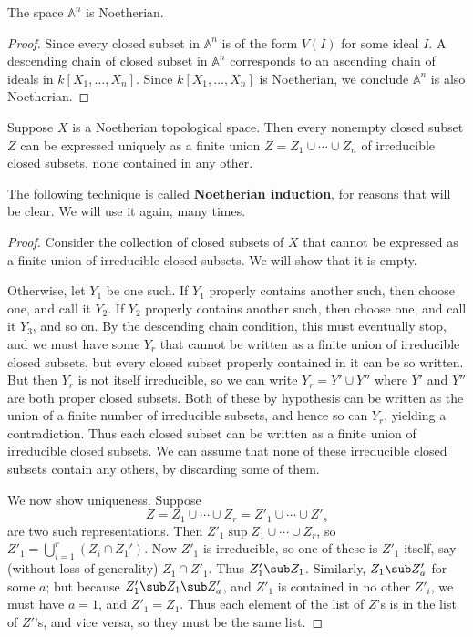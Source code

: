 \begin{proposition}
The space $\mathbb{A}^n$ is Noetherian.
\end{proposition}
\begin{proof}
Since every closed subset in $\mathbb{A}^n$ is of the form $V(I)$ for some ideal $I$. A descending chain of closed subset in $\mathbb{A}^n$ corresponds to an ascending chain of ideals in $k[X_1,\dots,X_n]$. Since $k[X_1,\dots,X_n]$ is Noetherian, we conclude $\mathbb{A}^n$ is also Noetherian.
\end{proof}
\begin{theorem}\label{Noe space irreducible deomp}
Suppose $X$ is a Noetherian topological space. Then every nonempty closed subset $Z$ can be expressed uniquely as a finite union $Z=Z_1\cup\cdots\cup Z_n$ of irreducible closed subsets, none contained in any other.
\end{theorem}
The following technique is called \textbf{Noetherian induction}, for reasons that will be clear. We will use it again, many times.
\begin{proof}
Consider the collection of closed subsets of $X$ that cannot be expressed as a finite union of irreducible closed subsets. We will show that it is empty.\par
Otherwise, let $Y_1$ be one such. If $Y_1$ properly contains another such, then choose one, and call it $Y_2$. If $Y_2$ properly contains another such, then choose one, and call it $Y_3$, and so on. By the descending chain condition, this must eventually stop, and we must have some $Y_r$ that cannot be written as a finite union of irreducible closed subsets, but every closed subset properly contained in it can be so written. But then $Y_r$ is not itself irreducible, so we can write $Y_r=Y'\cup Y''$ where $Y'$ and $Y''$ are both proper closed subsets. Both of these by hypothesis can be written as the union of a finite number of irreducible subsets, and hence so can $Y_r$, yielding a contradiction. Thus each closed subset can be written as a finite union of irreducible closed subsets. We can assume that none of these irreducible closed subsets contain any others, by discarding some of them.\par
We now show uniqueness. Suppose
\[Z=Z_1\cup\cdots\cup Z_r=Z'_1\cup\cdots\cup Z'_s\]
are two such representations. Then $Z'_1\sup Z_1\cup\cdots\cup Z_r$, so $Z'_1=\bigcup_{i=1}^{r}(Z_i\cap Z_1')$. Now $Z'_1$ is irreducible, so one of these is $Z'_1$ itself, say (without loss of generality) $Z_1\cap Z'_1$. Thus $Z'_1\sub Z_1$. Similarly, $Z_1\sub Z'_a$ for some $a$; but because $Z'_1\sub Z_1\sub Z'_a$, and $Z'_1$ is contained in no other $Z'_i$, we must have $a=1$, and $Z'_1=Z_1$. Thus each element of the list of $Z$'s is in the list of $Z'$'s, and vice versa, so they must be the same list.
\end{proof}
